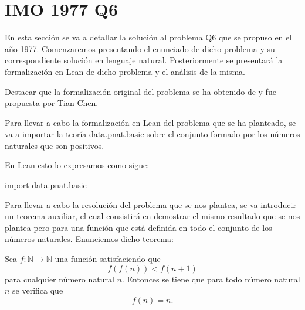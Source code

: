 \section{IMO 1977 Q6}

En esta sección se va a detallar la solución al problema Q6 que se
propuso en el año 1977. Comenzaremos presentando el enunciado de dicho
problema y su correspondiente solución en lenguaje
natural. Posteriormente se presentará la formalización en Lean de dicho
problema y el análisis de la misma.

Destacar que la formalización original del problema se ha obtenido de
\cite{TC} y fue propuesta por Tian Chen.

\noindent
{}


Para llevar a cabo la formalización en Lean del problema que
se ha planteado, se va a importar la teoría
\href{https://github.com/leanprover-community/mathlib/blob/
  master/src/data/pnat/basic.lean}{data.pnat.basic} sobre el conjunto
formado por los números naturales que son positivos.

En Lean esto lo expresamos como sigue:
\begin{leancode}
import data.pnat.basic
\end{leancode}

Para llevar a cabo la resolución del problema que se nos plantea,
se va introducir un teorema auxiliar, el cual consistirá en
demostrar el mismo resultado que se nos plantea pero para una
función que está definida en todo el conjunto de los números
naturales. Enunciemos dicho teorema:

\begin{teorema}[Extension]\label{extension}
  Sea \(f:ℕ → ℕ\) una función satisfaciendo que
  \begin{equation}
    f(f(n)) < f(n+1)
  \end{equation}
  para cualquier número natural \(n\). Entonces se tiene que
  para todo número natural \(n\) se verifica que
  \begin{equation}
    f(n) = n.
  \end{equation}
\end{teorema}

